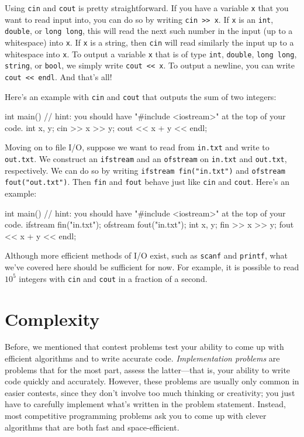 Using \texttt{cin} and \texttt{cout} is pretty straightforward. If you have a variable \texttt{x} that you want to read input into, you can do so by writing \verb+cin >> x+. If \texttt{x} is an \texttt{int}, \texttt{double}, or \texttt{long long}, this will read the next such number in the input (up to a whitespace) into \texttt{x}. If \texttt{x} is a string, then \texttt{cin} will read similarly the input up to a whitespace into \texttt{x}. To output a variable \texttt{x} that is of type \texttt{int}, \texttt{double}, \texttt{long long}, \texttt{string}, or \texttt{bool}, we simply write \verb+cout << x+. To output a newline, you can write \verb+cout << endl+. And that's all!

Here's an example with \texttt{cin} and \texttt{cout} that outputs the sum of two integers:

\begin{mylstlisting}
int main() {
  // hint: you should have "#include <iostream>" at the top of your code.
  int x, y;
  cin >> x >> y;
  cout << x + y << endl;
}
\end{mylstlisting}

Moving on to file I/O, suppose we want to read from \texttt{in.txt} and write to \texttt{out.txt}. We construct an \texttt{ifstream} and an \texttt{ofstream} on \texttt{in.txt} and \texttt{out.txt}, respectively. We can do so by writing \texttt{ifstream fin("in.txt")} and \texttt{ofstream fout("out.txt")}. Then \texttt{fin} and \texttt{fout} behave just like \texttt{cin} and \texttt{cout}. Here's an example:

\begin{mylstlisting}
int main() {
  // hint: you should have "#include <iostream>" at the top of your code.
  ifstream fin("in.txt");
  ofstream fout("in.txt");
  int x, y;
  fin >> x >> y;
  fout << x + y << endl;
}
\end{mylstlisting}

Although more efficient methods of I/O exist, such as \texttt{scanf} and \texttt{printf}, what we've covered here should be sufficient for now. For example, it is possible to read $10^5$ integers with \texttt{cin} and \texttt{cout} in a fraction of a second.

\section{Complexity}

Before, we mentioned that contest problems test your ability to come up with efficient algorithms and to write accurate code. \emph{Implementation problems} are problems that for the most part, assess the latter---that is, your ability to write code quickly and accurately. However, these problems are usually only common in easier contests, since they don't involve too much thinking or creativity; you just have to carefully implement what's written in the problem statement. Instead, most competitive programming problems ask you to come up with clever algorithms that are both fast and space-efficient.

